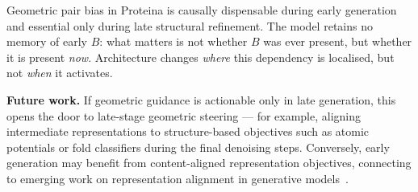 \documentclass{article}
\begin{document}
Geometric pair bias in Proteina is causally dispensable during early generation and essential only during late structural refinement.
The model retains no memory of early $B$: what matters is not whether $B$ was ever present, but whether it is present \emph{now}.
Architecture changes \emph{where} this dependency is localised, but not \emph{when} it activates.

\textbf{Future work.}
If geometric guidance is actionable only in late generation, this opens the door to late-stage geometric steering --- for example, aligning intermediate representations to structure-based objectives such as atomic potentials or fold classifiers during the final denoising steps.
Conversely, early generation may benefit from content-aligned representation objectives, connecting to emerging work on representation alignment in generative models~\citep{yu2025repa}.
\end{document}
